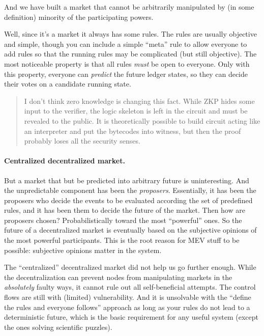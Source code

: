 And we have built a market that cannot be arbitrarily manipulated by (in some definition) minority of the participating powers.

Well, since it's a market it always has some rules.
The rules are usually objective and simple, though you can include a simple ``meta'' rule to allow everyone to add rules so that the running rules may be complicated (but still objective).
The most noticeable property is that all rules \emph{must} be open to everyone.
Only with this property, everyone can \emph{predict} the future ledger states, so they can decide their votes on a candidate running state.

\begin{quote}
    I don't think zero knowledge is changing this fact.
    While ZKP hides some input to the verifier, the logic skeleton is left in the circuit and must be revealed to the public.
    It is theoretically possible to build circuit acting like an interpreter and put the bytecodes into witness, but then the proof probably loses all the security senses.
\end{quote}

\paragraph{Centralized decentralized market.}
But a market that but be predicted into arbitrary future is uninteresting.
And the unpredictable component has been the \emph{proposers}.
Essentially, it has been the proposers who decide the events to be evaluated according the set of predefined rules, and it has been them to decide the future of the market.
Then how are proposers chosen?
Probabilistically toward the most ``powerful'' ones.
So the future of a decentralized market is eventually based on the subjective opinions of the most powerful participants.
This is the root reason for MEV stuff to be possible: subjective opinions matter in the system.

The ``centralized'' decentralized market did not help us go further enough.
While the decentralization can prevent nodes from manipulating markets in the \emph{absolutely} faulty ways, it cannot rule out all self-beneficial attempts.
The control flows are still with (limited) vulnerability.
And it is unsolvable with the ``define the rules and everyone follows'' approach as long as your rules do not lead to a deterministic future, which is the basic requirement for any useful system (except the ones solving scientific puzzles).

